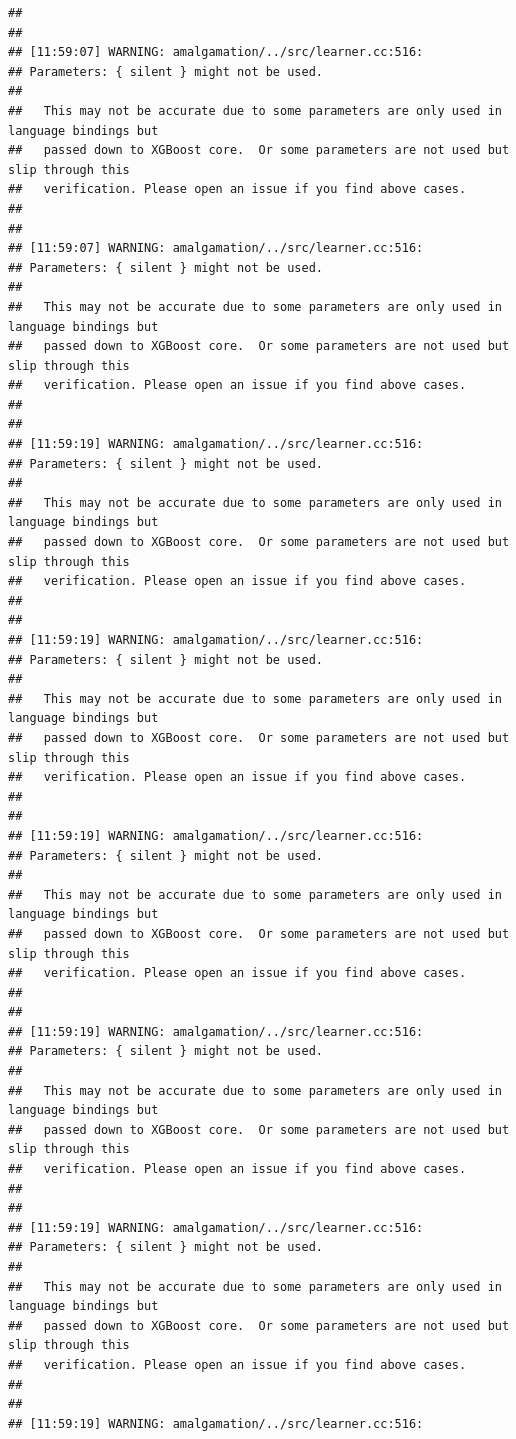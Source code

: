 \documentclass[AMS,STIX2COL]{WileyNJD-v2}\usepackage[]{graphicx}\usepackage[]{color}
\makeatletter
\newenvironment{kframe}{%
 \def\at@end@of@kframe{}%
 \ifinner\ifhmode%
  \def\at@end@of@kframe{\end{minipage}}%
  \begin{minipage}{\columnwidth}%
 \fi\fi%
 \def\FrameCommand##1{\hskip\@totalleftmargin \hskip-\fboxsep
 \colorbox{shadecolor}{##1}\hskip-\fboxsep
     \hskip-\linewidth \hskip-\@totalleftmargin \hskip\columnwidth}%
 \MakeFramed {\advance\hsize-\width
   \@totalleftmargin\z@ \linewidth\hsize
   \@setminipage}}%
 {\par\unskip\endMakeFramed%
 \at@end@of@kframe}
\newenvironment{knitrout}{}{} %
\makeatother
\begin{document}
\begin{knitrout}
\begin{kframe}
\begin{verbatim}
## 
## 
## [11:59:07] WARNING: amalgamation/../src/learner.cc:516: 
## Parameters: { silent } might not be used.
## 
##   This may not be accurate due to some parameters are only used in language bindings but
##   passed down to XGBoost core.  Or some parameters are not used but slip through this
##   verification. Please open an issue if you find above cases.
## 
## 
## [11:59:07] WARNING: amalgamation/../src/learner.cc:516: 
## Parameters: { silent } might not be used.
## 
##   This may not be accurate due to some parameters are only used in language bindings but
##   passed down to XGBoost core.  Or some parameters are not used but slip through this
##   verification. Please open an issue if you find above cases.
## 
## 
## [11:59:19] WARNING: amalgamation/../src/learner.cc:516: 
## Parameters: { silent } might not be used.
## 
##   This may not be accurate due to some parameters are only used in language bindings but
##   passed down to XGBoost core.  Or some parameters are not used but slip through this
##   verification. Please open an issue if you find above cases.
## 
## 
## [11:59:19] WARNING: amalgamation/../src/learner.cc:516: 
## Parameters: { silent } might not be used.
## 
##   This may not be accurate due to some parameters are only used in language bindings but
##   passed down to XGBoost core.  Or some parameters are not used but slip through this
##   verification. Please open an issue if you find above cases.
## 
## 
## [11:59:19] WARNING: amalgamation/../src/learner.cc:516: 
## Parameters: { silent } might not be used.
## 
##   This may not be accurate due to some parameters are only used in language bindings but
##   passed down to XGBoost core.  Or some parameters are not used but slip through this
##   verification. Please open an issue if you find above cases.
## 
## 
## [11:59:19] WARNING: amalgamation/../src/learner.cc:516: 
## Parameters: { silent } might not be used.
## 
##   This may not be accurate due to some parameters are only used in language bindings but
##   passed down to XGBoost core.  Or some parameters are not used but slip through this
##   verification. Please open an issue if you find above cases.
## 
## 
## [11:59:19] WARNING: amalgamation/../src/learner.cc:516: 
## Parameters: { silent } might not be used.
## 
##   This may not be accurate due to some parameters are only used in language bindings but
##   passed down to XGBoost core.  Or some parameters are not used but slip through this
##   verification. Please open an issue if you find above cases.
## 
## 
## [11:59:19] WARNING: amalgamation/../src/learner.cc:516: 

\end{verbatim}
\end{kframe}
\end{knitrout}
\end{document}

